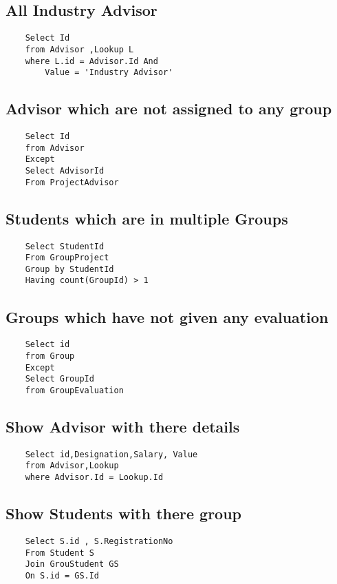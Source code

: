 \documentclass{article}
\begin{document}
\subsection{All Industry Advisor}
\begin{lstlisting}
    Select Id
    from Advisor ,Lookup L
    where L.id = Advisor.Id And
        Value = 'Industry Advisor'
\end{lstlisting}

\subsection{Advisor which are not assigned to any group}
\begin{lstlisting}
    Select Id
    from Advisor
    Except 
    Select AdvisorId
    From ProjectAdvisor
\end{lstlisting}

\subsection{Students which are in multiple Groups}
\begin{lstlisting}
    Select StudentId
    From GroupProject
    Group by StudentId
    Having count(GroupId) > 1
\end{lstlisting}

\subsection{Groups which have not given any evaluation}
\begin{lstlisting}
    Select id
    from Group 
    Except
    Select GroupId
    from GroupEvaluation
\end{lstlisting}

\subsection{Show Advisor with there details}
\begin{lstlisting}
    Select id,Designation,Salary, Value
    from Advisor,Lookup
    where Advisor.Id = Lookup.Id
\end{lstlisting}

\subsection{Show Students with there group}
\begin{lstlisting}
    Select S.id , S.RegistrationNo
    From Student S
    Join GrouStudent GS
    On S.id = GS.Id
\end{lstlisting}
\end{document}
